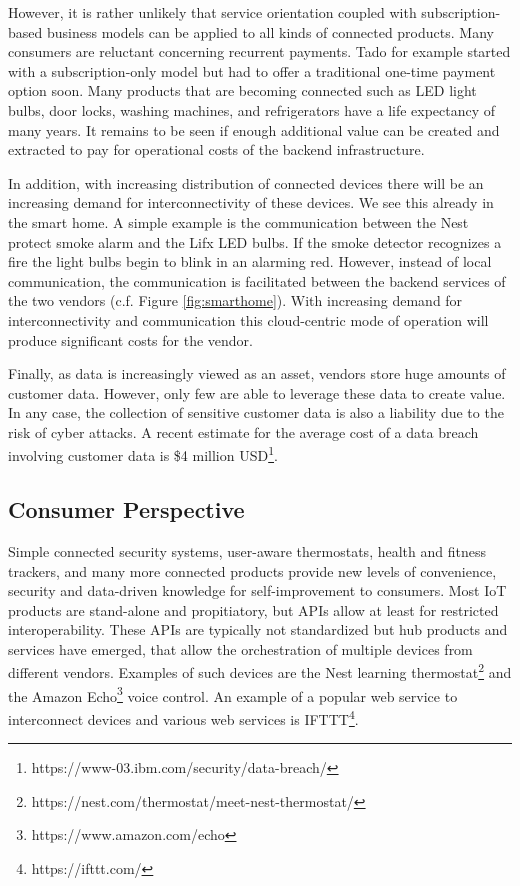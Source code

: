 However, it is rather unlikely that service orientation coupled with subscription-based business models can be applied to all kinds of connected products. Many consumers are reluctant concerning recurrent payments. Tado for example started with a subscription-only model but had to offer a traditional one-time payment option soon. Many products that are becoming connected such as LED light bulbs, door locks, washing machines, and refrigerators have a life expectancy of many years. It remains to be seen if enough additional value can be created and extracted to pay for operational costs of the backend infrastructure.

In addition, with increasing distribution of connected devices there will be an increasing demand for interconnectivity of these devices. We see this already in the smart home. A simple example is the communication between the Nest protect smoke alarm and the Lifx LED bulbs. If the smoke detector recognizes a fire the light bulbs begin to blink in an alarming red. However, instead of local communication, the communication is facilitated between the backend services of the two vendors (c.f. Figure \ref{fig:smarthome}). With increasing demand for interconnectivity and communication this cloud-centric mode of operation will produce significant costs for the vendor.

Finally, as data is increasingly viewed as an asset, vendors store huge amounts of customer data. However, only few are able to leverage these data to create value. In any case, the collection of sensitive customer data is also a liability due to the risk of cyber attacks. A recent estimate for the average cost of a data breach involving customer data is \$4 million USD\footnote{https://www-03.ibm.com/security/data-breach/}.


\subsection{Consumer Perspective}

Simple connected security systems, user-aware thermostats, health and fitness trackers, and many more connected products provide new levels of convenience, security and data-driven knowledge for self-improvement to consumers. Most IoT products are stand-alone and propitiatory, but APIs allow at least for restricted interoperability. These APIs are typically not standardized but hub products and services have emerged, that allow the orchestration of multiple devices from different vendors. Examples of such devices are the Nest learning thermostat\footnote{https://nest.com/thermostat/meet-nest-thermostat/} and the Amazon Echo\footnote{https://www.amazon.com/echo} voice control. An example of a popular web service to interconnect devices and various web services is IFTTT\footnote{https://ifttt.com/}. 

